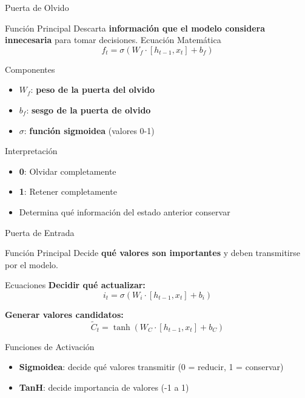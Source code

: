 \documentclass[
  ignorenonframetext,
]{beamer}
\providecommand{\tightlist}{%
  \setlength{\itemsep}{0pt}\setlength{\parskip}{0pt}}
\begin{document}
\begin{frame}{Puerta de Olvido}
\label{puerta-de-olvido}
\begin{block}{Función Principal}
\label{funciuxf3n-principal}
Descarta \textbf{información que el modelo considera innecesaria} para
tomar decisiones. Ecuación Matemática
\[f_t = \sigma(W_f \cdot [h_{t-1}, x_t] + b_f)\]
\end{block}

\begin{block}{Componentes}
\label{componentes}
\begin{itemize}
\tightlist
\item
  \(W_f\): \textbf{peso de la puerta del olvido}
\item
  \(b_f\): \textbf{sesgo de la puerta de olvido}
\item
  \(\sigma\): \textbf{función sigmoidea} (valores 0-1)
\end{itemize}
\end{block}

\begin{block}{Interpretación}
\label{interpretaciuxf3n}
\begin{itemize}
\tightlist
\item
  \textbf{0}: Olvidar completamente
\item
  \textbf{1}: Retener completamente
\item
  Determina qué información del estado anterior conservar
\end{itemize}
\end{block}
\end{frame}

\begin{frame}{Puerta de Entrada}
\label{puerta-de-entrada}
\begin{block}{Función Principal}
\label{funciuxf3n-principal-1}
Decide \textbf{qué valores son importantes} y deben transmitirse por el
modelo.
\end{block}

\begin{block}{Ecuaciones}
\label{ecuaciones}
\textbf{Decidir qué actualizar:}
\[i_t = \sigma(W_i \cdot [h_{t-1}, x_t] + b_i)\]

\textbf{Generar valores candidatos:}
\[\tilde{C}_t = \tanh(W_C \cdot [h_{t-1}, x_t] + b_C)\]
\end{block}

\begin{block}{Funciones de Activación}
\label{funciones-de-activaciuxf3n}
\begin{itemize}
\tightlist
\item
  \textbf{Sigmoidea}: decide qué valores transmitir (0 = reducir, 1 =
  conservar)
\item
  \textbf{TanH}: decide importancia de valores (-1 a 1)
\end{itemize}
\end{block}
\end{frame}
\end{document}
